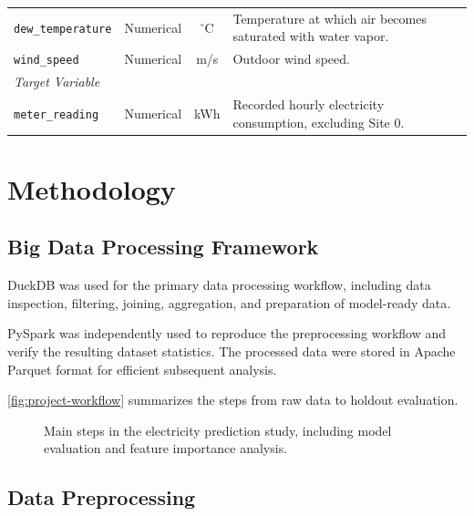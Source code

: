 \documentclass[12pt]{article}
\begin{document}
\begin{table}[htbp]
\begin{tabularx}{\textwidth}{
            l
            l
            c
            >{\raggedright\arraybackslash}X
        }
        \texttt{dew\_temperature} & Numerical & $^\circ$C &
        Temperature at which air becomes saturated
        with water vapor. \\

        \texttt{wind\_speed} & Numerical & m/s &
        Outdoor wind speed. \\

        \midrule
        \multicolumn{4}{l}{\textit{Target Variable}} \\

        \texttt{meter\_reading} & Numerical & kWh &
        Recorded hourly electricity consumption, excluding Site 0. \\

        \bottomrule
    \end{tabularx}
    \endgroup
\end{table}

\section{Methodology}

\subsection{Big Data Processing Framework}

DuckDB was used for the primary data processing workflow, including data inspection, filtering, joining, aggregation, and preparation of model-ready data.

PySpark was independently used to reproduce the preprocessing workflow and verify the resulting dataset statistics. The processed data were stored in Apache Parquet format for efficient subsequent analysis.

\autoref{fig:project-workflow} summarizes the steps from raw data to holdout evaluation.

\begin{figure}[H]
    \centering
    
    \caption{Main steps in the electricity prediction study,
    including model evaluation and feature importance analysis.}
    \label{fig:project-workflow}
\end{figure}

\subsection{Data Preprocessing}
\end{document}

